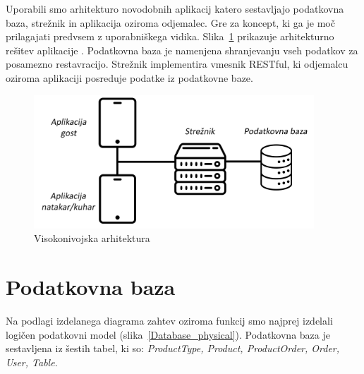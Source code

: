\documentclass[a4paper, 12pt]{book}
\begin{document}
Uporabili smo arhitekturo novodobnih aplikacij katero sestavljajo podatkovna baza, strežnik in aplikacija oziroma odjemalec. Gre za koncept, ki ga je moč prilagajati predvsem z uporabniškega vidika. Slika~\ref{StrukApk} prikazuje arhitekturno rešitev aplikacije \cite{TRINIVO}.
Podatkovna baza je namenjena shranjevanju vseh podatkov za posamezno restavracijo. Strežnik implementira vmesnik RESTful, ki odjemalcu oziroma aplikaciji posreduje podatke iz podatkovne baze. 

\begin{figure}[!htb]
\centering
\includegraphics[width=10.5cm]{Skica1-new.png}
\caption{Visokonivojska arhitektura}
\label{StrukApk}
\end{figure}


\section{Podatkovna baza}
Na podlagi izdelanega diagrama zahtev oziroma funkcij smo najprej izdelali logičen podatkovni model (slika~\ref{Database_physical}). Podatkovna baza je sestavljena iz šestih tabel, ki so: \textit{ProductType, Product, ProductOrder, Order, User, Table}. 
\end{document}
